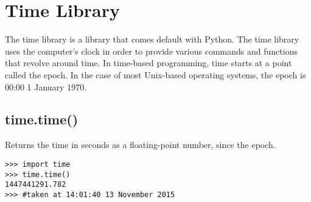 \chapter{Time Library}

The time library is a library that comes default with Python. The
time library uses the computer's clock in order to provide various
commands and functions that revolve around time. In time-based programming,
time starts at a point called the epoch. In the case of most Unix-based
operating systems, the epoch is 00:00 1 January 1970.


\section{time.time()}

Returns the time in seconds as a floating-point number, since the
epoch.

\begin{verbatim}
>>> import time
>>> time.time()
1447441291.782
>>> #taken at 14:01:40 13 November 2015
\end{verbatim}


